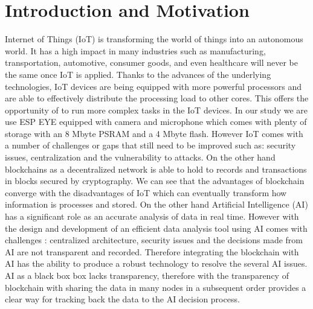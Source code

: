 \chapter{Introduction and Motivation}
\label{thesis:introduction}



Internet of Things (IoT) is transforming the world of things into an autonomous world. It has a high impact in many industries such as manufacturing, transportation, automotive, consumer goods, and even healthcare will never be the same
once IoT is applied. Thanks to the advances of the underlying technologies, IoT devices are being equipped with more powerful processors and are able to effectively distribute the processing load to other cores. This offers the opportunity of to run more complex tasks in the IoT devices. In our study we are use ESP EYE equipped with camera and microphone which comes with plenty of storage with an 8 Mbyte PSRAM and a 4 Mbyte flash. 
However IoT comes with a number of challenges or gaps  that still need to be improved such as: security issues, centralization and the vulnerability to attacks. 
On the other hand blockchains as a decentralized network is able to hold to records and transactions in blocks secured by cryptography. We can see that the advantages of blockchain converge with the disadvantages of IoT which can eventually transform how information is processes and stored. On the other hand Artificial Intelligence (AI) has a significant role as an accurate analysis of data in real time. However with the design and development of an efficient data analysis tool  using AI comes with challenges : centralized architecture, security issues and the decisions made from AI are not transparent and recorded. Therefore integrating the blockchain with AI has the ability to produce a robust technology to resolve the several AI issues. AI as a black box box lacks transparency, therefore with the transparency of blockchain with sharing the data in many nodes in a subsequent order provides a clear way for tracking back the data to the AI decision process.   

